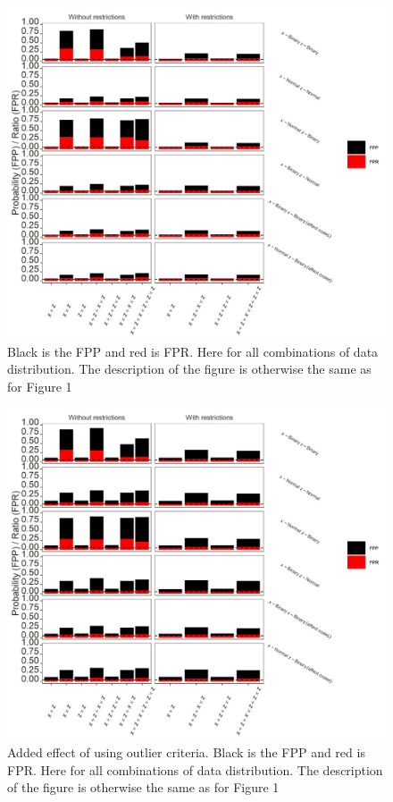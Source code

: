 \begin{figure}[t]
\includegraphics{R/Analysis/Result/Figures/Figure1ASI.jpeg}
\centering
\caption{Black is the FPP and red is FPR.  Here for all combinations of data distribution. The description of the figure is otherwise the same as for Figure 1}
\label{fig:mainfigure}
\end{figure}

\begin{figure}[t]
\includegraphics{R/Analysis/Result/Figures/Figure1BSI.jpeg}
\centering
\caption{Added effect of using outlier criteria. Black is the FPP and red is FPR.  Here for all combinations of data distribution. The description of the figure is otherwise the same as for Figure 1}
\label{fig:mainfigure}
\end{figure}

